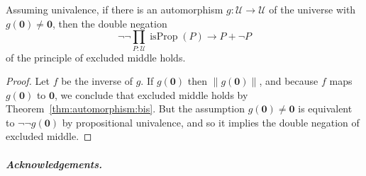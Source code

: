 \documentclass[a4paper,UKenglish]{lipics-v2016}
\newcommand{\abb}[1]{\todo[inline,caption={}]{#1}}
\newcommand{\isProp}{\operatorname{isProp}}
\newcommand{\UU}{\mathcal{U}}
\newcommand{\Empty}{\mathbf{0}}
\begin{document}
\begin{corollary}
  Assuming univalence, if there is an automorphism $g : \UU \to \UU$ of the universe
  with $g(\Empty) \ne \Empty$, then the double
  negation \[ \neg \neg \prod_{P:\UU} \isProp(P) \to P + \neg P \] of
  the principle of excluded middle holds.
\end{corollary}
\begin{proof}
  Let $f$ be the inverse of $g$. If $g(\Empty)$ then
  $\left\| g(\Empty) \right\|$, and because $f$ maps $g(\Empty)$ to
  $\Empty$, we conclude that excluded middle holds by
  Theorem~\ref{thm:automorphism:bis}.  But the assumption
  $g(\Empty) \ne \Empty$ is equivalent to $\neg \neg g(\Empty)$ by
  propositional univalence, and so it implies the double negation of
  excluded middle.
\end{proof}







\subparagraph*{Acknowledgements.}




\appendix






\end{document}
